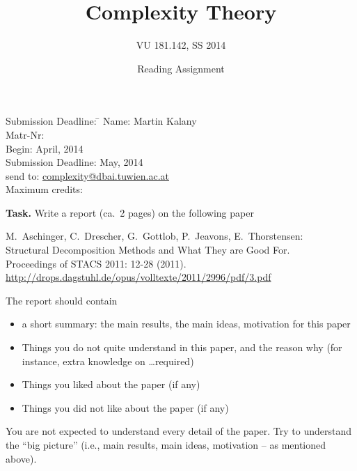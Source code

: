 \documentclass [11pt]{article}
\title{Complexity Theory}
\author{VU 181.142, SS 2014}
\date{Reading Assignment}
\begin{document}
\maketitle

\begin{tabbing}
Submission Deadline: \quad \= \kill
Name: \> Martin Kalany \\
Matr-Nr:  \\
Begin:  April,  2014  \\
Submission Deadline:  May, 2014  \\
send to: \> \url{complexity@dbai.tuwien.ac.at}\\
Maximum credits:  
\end{tabbing}



\medskip
\medskip

\noindent
{\bf Task.} Write a report (ca.\  2 pages) on the following paper



\begin{center}
\begin{minipage}{12.0cm}
M.~Aschinger, C.~Drescher, G.~Gottlob, P.~Jeavons, E.~Thorstensen: \\ 
Structural Decomposition Methods and What They are Good For. \\
Proceedings of STACS 2011: 12-28 (2011). \\
\url{http://drops.dagstuhl.de/opus/volltexte/2011/2996/pdf/3.pdf}
\end{minipage}
\end{center}

\noindent
The report should contain
%
\begin{itemize}
\item a short summary: the main results, the main ideas, motivation for this paper
\item Things you do not quite understand in this paper, and the reason why (for instance, extra knowledge on \dots required)
\item Things you liked about the paper (if any)
\item Things you did not like about the paper (if any)
\end{itemize}
%

\noindent
You are not expected to understand every detail of the paper. Try to understand the ``big picture'' (i.e., main results, main ideas, motivation -- as mentioned above).
\end{document}
